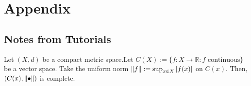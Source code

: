 \newpage
\section{Appendix}

\subsection{Notes from Tutorials}

\begin{theorem}
    Let $(X,d)$ be a compact metric space.\footnotemark  Let $C(X) := \{ f : X \to \mathbb{R} : f \text{ continuous}\}$ be a vector space. Take the uniform norm $\norm{f} := \sup_{x \in X} \abs{f(x)}$ on $C(x)$. Then, $(C(x), \norm{\bullet})$ is complete.\footnotemark
\end{theorem}



